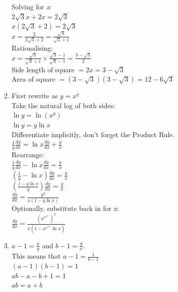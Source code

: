 \documentclass[../main.tex]{subfiles}
\begin{document}
\begin{enumerate}
    Solving for \textit{x}:\\
    \(2\sqrt{3}x+2x=2\sqrt{3}\)\\
    \(x(2\sqrt{3}+2)=2\sqrt{3}\)\\
    \(x=\frac{2}{2\sqrt{3}+2}=\frac{\sqrt{3}}{\sqrt{3}+1}\)\\

    Rationalising:\\
    \(x=\frac{\sqrt{3}}{\sqrt{3}+1}\times \frac{\sqrt{3}-1}{\sqrt{3}-1}=\frac{3-\sqrt{3}}{2}\)\\

    Side length of square \(=2x=3-\sqrt{3}\)\\
    Area of square \(=(3-\sqrt{3})(3-\sqrt{3})=12-6\sqrt{3}\)\\

    \item 
    First rewrite as \(y=x^y\)\\

    Take the natural log of both sides:\\
    \(\ln{y}=\ln{(x^y)}\)\\
    \(\ln{y}=y\ln{x}\)\\

    Differentiate implicitly, don't forget the Product Rule.\\
    \(\frac{1}{y}\frac{dy}{dx}=\ln{x}\frac{dy}{dx}+\frac{y}{x}\)\\

    Rearrange:\\
    \(\frac{1}{y}\frac{dy}{dx}-\ln{x}\frac{dy}{dx}=\frac{y}{x}\)\\
    \((\frac{1}{y}-\ln{x})\frac{dy}{dx}=\frac{y}{x}\)\\
    \((\frac{1-y\ln{x}}{y})\frac{dy}{dx}=\frac{y}{x}\)\\
    \(\frac{dy}{dx}=\frac{y^2}{x(1-y\ln{x})}\)\\

    Optionally, substitute back in for \textit{x}:\\
    \(\frac{dy}{dx}=\frac{(x^{x^{x^{x^{.^{.^{.}}}}}})^2}{x(1-x^{x^{x^{x^{.^{.^{.}}}}}}\ln{x})}\)\\

    \item 
    \(a-1=\frac{x}{y}\) and \(b-1=\frac{y}{x}\).\\
    This means that \(a-1=\frac{1}{b-1}\)\\

    \((a-1)(b-1)=1\)\\
    \(ab-a-b+1=1\)\\
    \(ab=a+b\)\\


\end{enumerate}
\end{document}
